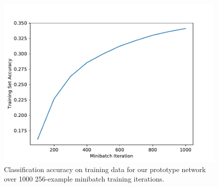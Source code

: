 \begin{figure}
\includegraphics[width=\columnwidth]{img/accuracy}
\caption{
Classification accuracy on training data for our prototype network over 1000 256-example minibatch training iterations.
}
\label{fig:accuracy}
\end{figure}